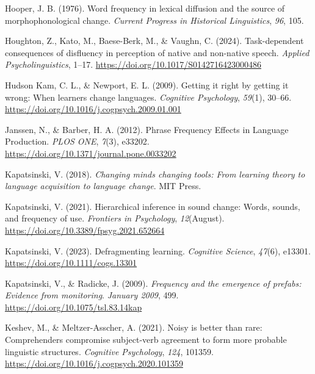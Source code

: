 \documentclass[
  12pt,
  letterpaper,
]{scrreprt}
\newlength{\cslhangindent}
\newenvironment{CSLReferences}[2] %
 {\begin{list}{}{%
  \setlength{\itemindent}{0pt}
  \setlength{\leftmargin}{0pt}
  \setlength{\parsep}{0pt}
  \ifodd #1
   \setlength{\leftmargin}{\cslhangindent}
   \setlength{\itemindent}{-1\cslhangindent}
  \fi
  \setlength{\itemsep}{#2\baselineskip}}}
 {\end{list}}
\begin{document}
\begin{CSLReferences}{1}{0}
Hooper, J. B. (1976). Word frequency in lexical diffusion and the source
of morphophonological change. \emph{Current Progress in Historical
Linguistics}, \emph{96}, 105.

Houghton, Z., Kato, M., Baese-Berk, M., \& Vaughn, C. (2024).
Task-dependent consequences of disfluency in perception of native and
non-native speech. \emph{Applied Psycholinguistics}, 1--17.
\url{https://doi.org/10.1017/S0142716423000486}

Hudson Kam, C. L., \& Newport, E. L. (2009). Getting it right by getting
it wrong: When learners change languages. \emph{Cognitive Psychology},
\emph{59}(1), 30--66.
\url{https://doi.org/10.1016/j.cogpsych.2009.01.001}

Janssen, N., \& Barber, H. A. (2012). Phrase Frequency Effects in
Language Production. \emph{PLOS ONE}, \emph{7}(3), e33202.
\url{https://doi.org/10.1371/journal.pone.0033202}

Kapatsinski, V. (2018). \emph{Changing minds changing tools: From
learning theory to language acquisition to language change}. MIT Press.

Kapatsinski, V. (2021). Hierarchical inference in sound change: Words,
sounds, and frequency of use. \emph{Frontiers in Psychology},
\emph{12}(August). \url{https://doi.org/10.3389/fpsyg.2021.652664}

Kapatsinski, V. (2023). Defragmenting learning. \emph{Cognitive
Science}, \emph{47}(6), e13301. \url{https://doi.org/10.1111/cogs.13301}

Kapatsinski, V., \& Radicke, J. (2009). \emph{Frequency and the
emergence of prefabs: Evidence from monitoring}. \emph{January 2009},
499. \url{https://doi.org/10.1075/tsl.83.14kap}

Keshev, M., \& Meltzer-Asscher, A. (2021). Noisy is better than rare:
Comprehenders compromise subject-verb agreement to form more probable
linguistic structures. \emph{Cognitive Psychology}, \emph{124}, 101359.
\url{https://doi.org/10.1016/j.cogpsych.2020.101359}


\end{CSLReferences}
\end{document}
